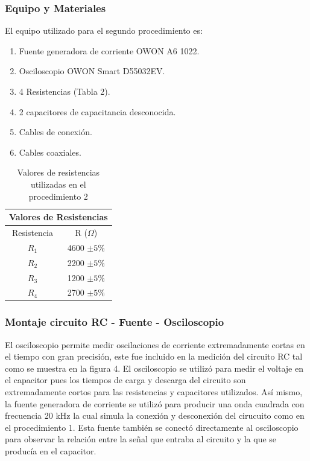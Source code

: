 \documentclass[10pt,letter]{article}
\begin{document}
\begin{multicols}{2}
\subsubsection{Equipo y Materiales}
El equipo utilizado para el segundo procedimiento es:
\begin{enumerate}
\itemsep=0cm
\item Fuente generadora de corriente OWON A6 1022.
\item Osciloscopio OWON Smart D55032EV.
\item 4 Resistencias (Tabla 2).
\item 2 capacitores de capacitancia desconocida.
\item Cables de conexión.
\item Cables coaxiales.
\end{enumerate}
\begin{table}[H]
\centering
\begin{tabular}{|c|c|}
\hline
\multicolumn{2}{|l|}{Valores de Resistencias} \\ \hline
Resistencia & R ($\Omega$) \\ \hline
$R_1$ & 4600 $\pm 5\%$ \\ \hline
$R_2$ & 2200 $\pm 5\%$ \\ \hline
$R_3$ & 1200 $\pm 5\%$ \\ \hline
$R_4$ & 2700 $\pm 5\%$ \\ \hline
\end{tabular}
\caption{Valores de resistencias utilizadas en el procedimiento 2}
\end{table}
\subsubsection{Montaje circuito RC - Fuente - Osciloscopio}

El osciloscopio permite medir oscilaciones de corriente extremadamente cortas en el tiempo con gran precisión, este fue incluido en la medición del circuito RC tal como se muestra en la figura 4. El osciloscopio se utilizó para medir el voltaje en el capacitor pues los tiempos de carga y descarga del circuito son extremadamente cortos para las resistencias y capacitores utilizados. Así mismo, la fuente generadora de corriente se utilizó para producir una onda cuadrada con frecuencia 20 kHz la cual simula la conexión y desconexión del cirucuito como en el procedimiento 1. Esta fuente también se conectó directamente al osciloscopio para observar la relación entre la señal que entraba al circuito y la que se producía en el capacitor.


\end{multicols}
\end{document}
